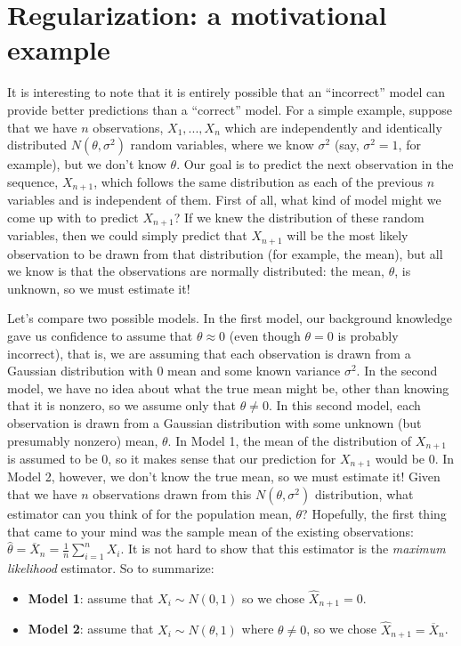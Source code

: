 \section{Regularization: a motivational example}

It is interesting to note that it is entirely possible that an ``incorrect'' model can provide better predictions than a ``correct'' model. For a simple example, suppose that we have $n$ observations, $X_1, ..., X_n$ which are independently and identically distributed $N(\theta, \sigma^2)$ random variables, where we know $\sigma^2$ (say, $\sigma^2 = 1$, for example), but we don't know $\theta$. Our goal is to predict the next observation in the sequence, $X_{n + 1}$, which follows the same distribution as each of the previous $n$ variables and is independent of them. First of all, what kind of model might we come up with to predict $X_{n + 1}$? If we knew the distribution of these random variables, then we could simply predict that $X_{n + 1}$ will be the most likely observation to be drawn from that distribution (for example, the mean), but all we know is that the observations are normally distributed: the mean, $\theta$, is unknown, so we must estimate it! 

Let's compare two possible models. In the first model, our background knowledge gave us confidence to assume that $\theta \approx 0$ (even though $\theta = 0$ is probably incorrect), that is, we are assuming that each observation is drawn from a Gaussian distribution with $0$ mean and some known variance $\sigma^2$. In the second model, we have no idea about what the true mean might be, other than knowing that it is nonzero, so we assume only that $\theta \neq 0$. In this second model, each observation is drawn from a Gaussian distribution with some unknown (but presumably nonzero) mean, $\theta$. In Model 1, the mean of the distribution of $X_{n + 1}$ is assumed to be 0, so it makes sense that our prediction for $X_{n + 1}$ would be 0. In Model 2, however, we don't know the true mean, so we must estimate it! Given that we have $n$ observations drawn from this $N(\theta, \sigma^2)$ distribution, what estimator can you think of for the population mean, $\theta$? Hopefully, the first thing that came to your mind was the sample mean of the existing observations: $\hat{\theta} = \overline{X}_n = \frac{1}{n} \sum_{i = 1}^n X_i$. It is not hard to show that this estimator is the \textit{maximum likelihood} estimator. So to summarize:


\begin{itemize}
\item \textbf{Model 1}: assume that $X_i \sim N(0, 1)$ so we chose $\hat{X}_{n + 1} = 0$.
\item \textbf{Model 2}: assume that $X_i \sim N(\theta, 1)$ where $\theta \neq 0$, so we chose $\hat{X}_{n + 1} = \overline{X}_n$.
\end{itemize}


